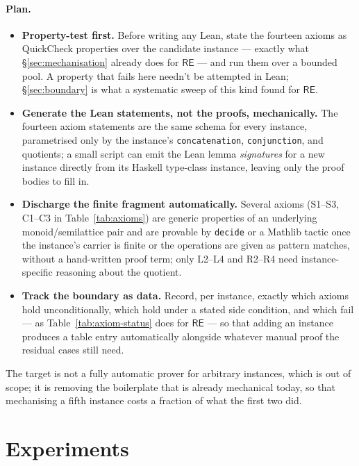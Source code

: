 \documentclass[acmsmall,screen]{acmart}
\newcommand{\RE}{\mathsf{RE}}
\begin{document}
\paragraph{Plan.}
\begin{itemize}[wide, labelindent=10pt]
  \item \textbf{Property-test first.} Before writing any Lean, state the
        fourteen axioms as QuickCheck properties over the candidate instance
        --- exactly what \S\ref{sec:mechanisation} already does for $\RE$
        --- and run them over a bounded pool. A property that fails here
        needn't be attempted in Lean; \S\ref{sec:boundary} is what a
        systematic sweep of this kind found for $\RE$.
  \item \textbf{Generate the Lean statements, not the proofs, mechanically.}
        The fourteen axiom statements are the same schema for every instance,
        parametrised only by the instance's \lstinline{concatenation},
        \lstinline{conjunction}, and quotients; a small script can emit the
        Lean lemma \emph{signatures} for a new instance directly from its
        Haskell type-class instance, leaving only the proof bodies to fill
        in.
  \item \textbf{Discharge the finite fragment automatically.} Several
        axioms (S1--S3, C1--C3 in Table~\ref{tab:axioms}) are generic
        properties of an underlying monoid/semilattice pair and are
        provable by \lstinline{decide} or a Mathlib tactic once the
        instance's carrier is finite or the operations are given as
        pattern matches, without a hand-written proof term; only L2--L4 and
        R2--R4 need instance-specific reasoning about the quotient.
  \item \textbf{Track the boundary as data.} Record, per instance, exactly
        which axioms hold unconditionally, which hold under a stated side
        condition, and which fail --- as Table~\ref{tab:axiom-status} does
        for $\RE$ --- so that adding an instance produces a table entry
        automatically alongside whatever manual proof the residual cases
        still need.
\end{itemize}
The target is not a fully automatic prover for arbitrary instances, which
is out of scope; it is removing the boilerplate that is already mechanical
today, so that mechanising a fifth instance costs a fraction of what the
first two did.

\section{Experiments}
\label{sec:experiments}
\end{document}
